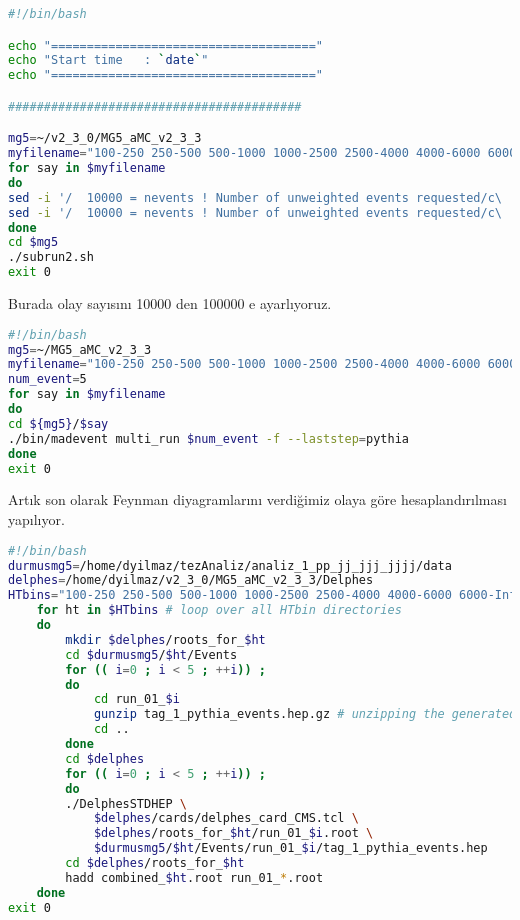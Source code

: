 \begin{lstlisting}[language=bash,caption={olay sayisi ayarlaniyor}]
#!/bin/bash

echo "====================================="
echo "Start time   : `date`"
echo "====================================="

#########################################

mg5=~/v2_3_0/MG5_aMC_v2_3_3
myfilename="100-250 250-500 500-1000 1000-2500 2500-4000 4000-6000 6000-Inf"
for say in $myfilename
do
sed -i '/  10000 = nevents ! Number of unweighted events requested/c\  100000 = nevents ! Number of unweighted events requested' ${mg5}/$say/Cards/run_card.dat
sed -i '/  10000 = nevents ! Number of unweighted events requested/c\  100000 = nevents ! Number of unweighted events requested' ${mg5}/$say/Cards/run_card_default.dat
done
cd $mg5
./subrun2.sh
exit 0
\end{lstlisting}
Burada olay sayısını 10000 den 100000 e ayarlıyoruz.

\begin{lstlisting}[language=bash,caption={olaylar uretiliyor}]
#!/bin/bash
mg5=~/MG5_aMC_v2_3_3
myfilename="100-250 250-500 500-1000 1000-2500 2500-4000 4000-6000 6000-Inf"
num_event=5
for say in $myfilename
do
cd ${mg5}/$say
./bin/madevent multi_run $num_event -f --laststep=pythia
done
exit 0
\end{lstlisting}

Artık son olarak Feynman diyagramlarını verdiğimiz olaya göre hesaplandırılması yapılıyor.

\begin{lstlisting}[language=bash,caption={dedektor similasyonu yapiliyor}]
#!/bin/bash
durmusmg5=/home/dyilmaz/tezAnaliz/analiz_1_pp_jj_jjj_jjjj/data
delphes=/home/dyilmaz/v2_3_0/MG5_aMC_v2_3_3/Delphes
HTbins="100-250 250-500 500-1000 1000-2500 2500-4000 4000-6000 6000-Inf"
	for ht in $HTbins # loop over all HTbin directories
	do
		mkdir $delphes/roots_for_$ht
		cd $durmusmg5/$ht/Events 
		for (( i=0 ; i < 5 ; ++i)) ;
		do
			cd run_01_$i
			gunzip tag_1_pythia_events.hep.gz # unzipping the generated hep files
			cd ..
		done
		cd $delphes
		for (( i=0 ; i < 5 ; ++i)) ;
		do
		./DelphesSTDHEP \
			$delphes/cards/delphes_card_CMS.tcl \
			$delphes/roots_for_$ht/run_01_$i.root \
			$durmusmg5/$ht/Events/run_01_$i/tag_1_pythia_events.hep 		done
		cd $delphes/roots_for_$ht
		hadd combined_$ht.root run_01_*.root
	done
exit 0

\end{lstlisting}

